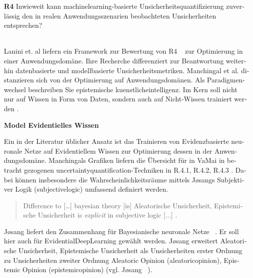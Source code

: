 \begin{otherlanguage}{ngerman}
\textbf{R4} Inwieweit kann \gls{machinelearning}-basierte Unsicherheitsquantifizierung zuverlässig den in realen Anwendungsszenarien beobachteten Unsicherheiten entsprechen?
\par\noindent\\


Lanini et. al liefern ein Framework zur Bewertung von R4 ~\parencite{Lanini2024} zur Optimierung in einer Anwendungsdomäne. Ihre Recherche differenziert zur Beantwortung weiterhin datenbasierte und modellbasierte Unsicherheitsmetriken. 
\newline
Manchingal et al. distanzieren sich von der Optimierung auf Anwendungsdomänen. Als Paradigmenwechsel beschreiben Sie epistemische \gls{kuenstlicheintelligenz}. Im Kern soll nicht nur auf Wissen in Form von Daten, sondern auch auf Nicht-Wissen trainiert werden \parencite{manchingal2025}. 


\pagebreak


\textbf{Model Evidentielles Wissen}

Ein in der Literatur üblicher Ansatz ist das Trainieren von \gls{Evidenzbasierte neuronale Netze} auf Evidentiellem Wissen zur Optimierung dessen in der Anwendungsdomäne. Manchingals Grafiken liefern die Übersicht für in VaMai in betracht gezogenen \gls{uncertaintyquantification}-Techniken in R.4.1, R.4.2, R.4.3 . Dabei können insbesondere die Wahrscheinlichkeitsräume mittels Jøsangs Subjektiver Logik (\gls{subjectivelogic}) umfassend definiert werden. 

\begin{quote}
  Difference to [\dots] bayesian theory [is] \gls{Aleatorische Unsicherheit}, \gls{Epistemische Unsicherheit} is \textit{explicit} in subjective logic [...] \parencite[vgl S. 42]{josang2016subjective}.
\end{quote}

Jøsang liefert den Zusammenhang für \gls{Bayesianische neuronale Netze} ~\parencite[vgl. S.42]{josang2016subjective}. Er soll hier auch für \gls{EvidentialDeepLearning} gewählt werden. Jøsang erweitert \gls{Aleatorische Unsicherheit}, \gls{Epistemische Unsicherheit} als Unsicherheiten erster Ordnung zu Unsicherheiten zweiter Ordnung \glqq Aleatoric Opinion \grqq (\gls{aleatoricopinion}), \glqq Epistemic Opinion \grqq (\gls{epistemicopinion}) (vgl. Jøsang ~\parencite[S.22, Z.10-16; S.22 Z. 17-26; S.23, Z. 5-; S.23 Z.9-12]{josang2016subjective}). \par\noindent\\


\end{otherlanguage}
